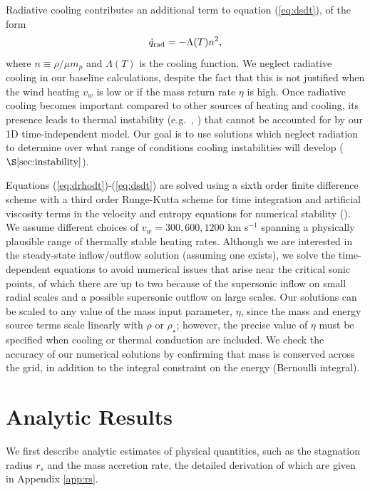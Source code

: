 \documentclass[usenatbib,fleqn]{mn2e}
\newcommand{\rs}{r_s}
\newcommand{\vwO}{v_{w}}
\begin{document}
 Radiative cooling contributes an additional term to equation
 (\ref{eq:dsdt}), of the form
\begin{equation}
\dot{q}_{\rm rad} = -\Lambda(T)n^{2},
\label{eq:qdot_rad}
\end{equation}
where $n \equiv \rho/\mu m_p$ and $\Lambda(T)$ is the cooling
function.  We neglect radiative cooling in our baseline calculations,
despite the fact that this is not justified when the wind heating
$\vwO$ is low or if the mass return rate $\eta$ is high.  Once
radiative cooling becomes important compared to other sources of
heating and cooling, its presence leads to thermal instability
(e.g.~\citealt{McCourt+12}, \citealt{Li&Bryan14a}) that cannot be
accounted for by our 1D time-independent model.  Our goal is to use
solutions which neglect radiation to determine over what range of
conditions cooling instabilities will develop
($\S\ref{sec:instability}$).

Equations (\ref{eq:drhodt})-(\ref{eq:dsdt}) are solved using a sixth
order finite difference scheme with a third order Runge-Kutta scheme
for time integration and artificial viscosity terms in the velocity
and entropy equations for numerical stability
(\citealt{Brandenburg:2003a}).  We assume different choices of $v_{w}
= 300, 600, 1200$ km s$^{-1}$ spanning a physically plausible range of
thermally stable heating rates.  Although we are
interested in the steady-state inflow/outflow solution (assuming one
exists), we solve the time-dependent equations to avoid numerical
issues that arise near the critical sonic points, of which there are
up to two because of the supersonic inflow on small radial scales and
a possible supersonic outflow on large scales.  Our
solutions can be scaled to any value of the mass input parameter,
$\eta$, since the mass and energy source terms scale linearly with
$\rho$ or $\rho_{\star}$; however, the precise value of $\eta$ must be
specified when cooling or thermal conduction are included.  We check the accuracy of
our numerical solutions by confirming that mass is conserved across
the grid, in addition to the integral constraint on the energy
(Bernoulli integral).



\section{Analytic Results}
\label{sec:results}

We first describe analytic estimates of physical quantities, such as
the stagnation radius $\rs$ and the mass accretion rate, the detailed
derivation of which are given in Appendix \ref{app:rs}.  
\end{document}
